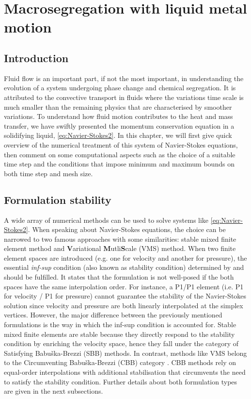 \chapter{Macrosegregation with liquid metal motion}
\begin{nolinkcolors} 
\minitoc
\end{nolinkcolors}
\newpage
%
%
\section{Introduction}
Fluid flow is an important part, if not the most important, in understanding the evolution of a system
undergoing phase change and chemical segregation. It is attributed to the convective transport in fluids
where the variations time scale is much smaller than the remaining physics that are characterised by
smoother variations. To understand how fluid motion contributes to the heat and mass transfer, we have 
swiftly presented the momentum conservation equation in a solidifying liquid, \cref{eq:Navier-Stokes2}.
In this chapter, we will first give quick overview of the numerical treatment of this system of 
Navier-Stokes equations, then comment on some computational aspects such as the choice of a suitable time step and
the conditions that impose minimum and maximum bounds on both time step and mesh size.
%
%
\section{Formulation stability}
A wide array of numerical methods can be used to solve systems like \cref{eq:Navier-Stokes2}. 
When speaking about Navier-Stokes equations, the choice can be narrowed to two famous
approaches with some similarities: stable mixed finite element method and \textbf{V}ariational \textbf{M}utli\textbf{S}cale (VMS) method.
When two finite element spaces are introduced (e.g. one for velocity and another for pressure), 
the essential \emph{inf-sup} condition (also known as stability condition) determined by \citet{babuska_error-bounds_1971} and \citet{brezzi_existence_1974} 
should be fulfilled. It states that the formulation is not well-posed if the both spaces have the same interpolation 
order. For instance, a P1/P1 element (i.e. P1 for velocity / P1 for pressure) cannot guarantee the stability of the Navier-Stokes solution since
velocity and pressure are both linearly interpolated at the simplex vertices.
However, the major difference between the previously mentioned formulations is the way in which the inf-sup condition is accounted for.
Stable mixed finite elements are stable because they directly respond to the stability condition by enriching the velocity space, 
hence they fall under the category of Satisfying Babuška-Brezzi (SBB) methods. In contrast, methods like VMS belong to the
Circumventing Babuška-Brezzi (CBB) category \citep{barbosa_finite_1991}.
CBB methods rely on equal-order interpolations with additional stabilisation that circumvents the need to satisfy the stability condition.
Further details about both formulation types are given in the next subsections.
%
